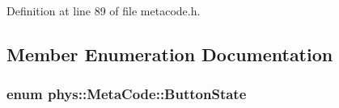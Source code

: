 Definition at line 89 of file metacode.h.

\subsection{Member Enumeration Documentation}
\hypertarget{classphys_1_1MetaCode_a2fdfb26b3e50ceb0ccc60bfc4c3d6ac2}{
\subsubsection[{ButtonState}]{\setlength{\rightskip}{0pt plus 5cm}enum {\bf phys::MetaCode::ButtonState}}}
\label{da/dc9/classphys_1_1MetaCode_a2fdfb26b3e50ceb0ccc60bfc4c3d6ac2}


